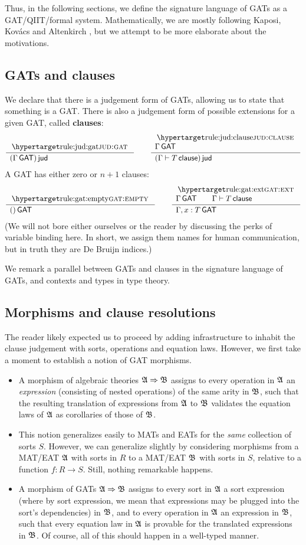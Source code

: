 \documentclass[a4paper]{article}
\begin{document}
Thus, in the following sections, we define the signature language of GATs as a GAT/QIIT/formal system.
Mathematically, we are mostly following Kaposi, Kov\'acs and Altenkirch \cite{constructing-qiits}, but we attempt to be more elaborate about the motivations.

\subsection{GATs and clauses}
We declare that there is a judgement form of GATs, allowing us to state that something is a GAT.
There is also a judgement form of possible extensions for a given GAT, called \textbf{clauses}:
\[
	\inferencel{jud:gat}{
	}{
		(\Gamma \GAT) \jud
	}{}
	\qquad
	\inferencel{jud:clause}{
		\Gamma \GAT
	}{
		(\Gamma \sez T \clause) \jud
	}{}
\]
A GAT has either zero or $n+1$ clauses:
\[
	\inferencel{gat:empty}{
	}{
		() \GAT
	}{}
	\qquad
	\inferencel{gat:ext}{
		\Gamma \GAT \qquad
		\Gamma \sez T \clause
	}{
		\Gamma, x : T \GAT
	}{}
\]
(We will not bore either ourselves or the reader by discussing the perks of variable binding here. In short, we assign them names for human communication, but in truth they are De Bruijn indices.)

We remark a parallel between GATs and clauses in the signature language of GATs, and contexts and types in type theory.

\subsection{Morphisms and clause resolutions}
The reader likely expected us to proceed by adding infrastructure to inhabit the clause judgement with sorts, operations and equation laws.
However, we first take a moment to establish a notion of GAT morphisms.
\begin{itemize}
	\item A morphism of algebraic theories ${{\mathfrak{A}}} \Rightarrow {{\mathfrak{B}}}$ assigns to every operation in ${{\mathfrak{A}}}$ an \emph{expression} (consisting of nested operations) of the same arity in ${{\mathfrak{B}}}$, such that the resulting translation of expressions from ${{\mathfrak{A}}}$ to ${{\mathfrak{B}}}$ validates the equation laws of ${{\mathfrak{A}}}$ as corollaries of those of ${{\mathfrak{B}}}$.
	\item This notion generalizes easily to MATs and EATs for the \emph{same} collection of sorts $S$. However, we can generalize slightly by considering morphisms from a MAT/EAT ${{\mathfrak{A}}}$ with sorts in $R$ to a MAT/EAT ${{\mathfrak{B}}}$ with sorts in $S$, relative to a function $f : R \to S$.
	Still, nothing remarkable happens.
	\item A morphism of GATs ${{\mathfrak{A}}} \Rightarrow {{\mathfrak{B}}}$ assigns
	to every sort in ${{\mathfrak{A}}}$ a sort expression (where by sort expression, we mean that expressions may be plugged into the sort's dependencies) in ${{\mathfrak{B}}}$, and
	to every operation in ${{\mathfrak{A}}}$ an expression in ${{\mathfrak{B}}}$,
	such that every equation law in ${{\mathfrak{A}}}$ is provable for the translated expressions in ${{\mathfrak{B}}}$.
	Of course, all of this should happen in a well-typed manner.
\end{itemize}
\end{document}
